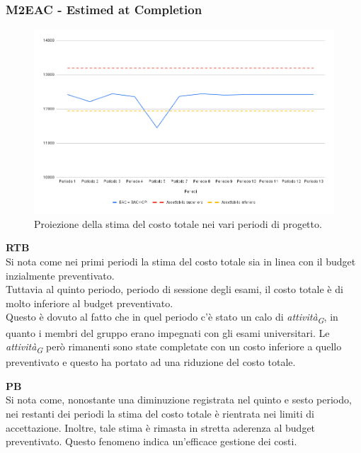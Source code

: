 \subsubsection{M2EAC - Estimed at Completion}

\vspace{0.3cm}

\begin{figure}[H]
    \centering
    \includegraphics[width=1\textwidth]{../Images/PianoDiQualifica/M2EAC.png}
    \caption{Proiezione della stima del costo totale nei vari periodi di progetto.}
    \label{fig:2}
\end{figure}

\vspace{0.2cm}

\textbf{RTB} \\
Si nota come nei primi periodi la stima del costo totale sia in linea con il budget inzialmente preventivato. \\
Tuttavia al quinto periodo, periodo di sessione degli esami, il costo totale è di molto inferiore al budget preventivato. \\
Questo è dovuto al fatto che in quel periodo c'è stato un calo di \textit{attività}\textsubscript{\textit{G}}, in quanto i membri del gruppo erano impegnati con gli esami universitari. Le \textit{attività}\textsubscript{\textit{G}} però rimanenti sono state completate con un costo inferiore a quello preventivato e questo ha portato ad una riduzione del costo totale.

\vspace{0.3cm}

\textbf{PB} \\
Si nota come, nonostante una diminuzione registrata nel quinto e sesto periodo, nei restanti dei periodi la stima del costo totale è rientrata nei limiti di accettazione. Inoltre, tale stima è rimasta in stretta aderenza al budget preventivato. Questo fenomeno indica un’efficace gestione dei costi.


